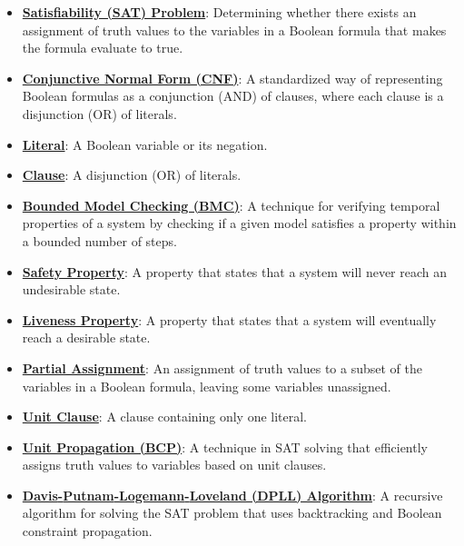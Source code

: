 \documentclass{article}%
\begin{document}
\begin{itemize}[leftmargin=*]%
\item \href{https://www.math.purdue.edu/~yipn/351/15L2-SAT.pdf#page=2}{\textbf{Satisfiability (SAT) Problem}}: Determining whether there exists an assignment of truth values to the variables in a Boolean formula that makes the formula evaluate to true.%
\item \href{https://www.math.purdue.edu/~yipn/351/15L2-SAT.pdf#page=7}{\textbf{Conjunctive Normal Form (CNF)}}: A standardized way of representing Boolean formulas as a conjunction (AND) of clauses, where each clause is a disjunction (OR) of literals.%
\item \href{https://www.math.purdue.edu/~yipn/351/15L2-SAT.pdf#page=7}{\textbf{Literal}}: A Boolean variable or its negation.%
\item \href{https://www.math.purdue.edu/~yipn/351/15L2-SAT.pdf#page=7}{\textbf{Clause}}: A disjunction (OR) of literals.%
\item \href{https://www.math.purdue.edu/~yipn/351/15L2-SAT.pdf#page=6}{\textbf{Bounded Model Checking (BMC)}}: A technique for verifying temporal properties of a system by checking if a given model satisfies a property within a bounded number of steps.%
\item \href{https://www.math.purdue.edu/~yipn/351/15L2-SAT.pdf#page=51}{\textbf{Safety Property}}: A property that states that a system will never reach an undesirable state.%
\item \href{https://www.math.purdue.edu/~yipn/351/15L2-SAT.pdf#page=51}{\textbf{Liveness Property}}: A property that states that a system will eventually reach a desirable state.%
\item \href{https://www.math.purdue.edu/~yipn/351/15L2-SAT.pdf#page=14}{\textbf{Partial Assignment}}: An assignment of truth values to a subset of the variables in a Boolean formula, leaving some variables unassigned.%
\item \href{https://www.math.purdue.edu/~yipn/351/15L2-SAT.pdf#page=20}{\textbf{Unit Clause}}: A clause containing only one literal.%
\item \href{https://www.math.purdue.edu/~yipn/351/15L2-SAT.pdf#page=20}{\textbf{Unit Propagation (BCP)}}: A technique in SAT solving that efficiently assigns truth values to variables based on unit clauses.%
\item \href{https://www.math.purdue.edu/~yipn/351/15L2-SAT.pdf#page=17}{\textbf{Davis{-}Putnam{-}Logemann{-}Loveland (DPLL) Algorithm}}: A recursive algorithm for solving the SAT problem that uses backtracking and Boolean constraint propagation.%

\end{itemize}
\end{document}
